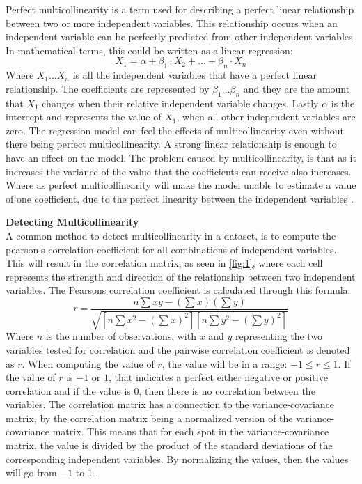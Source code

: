 Perfect multicollinearity is a term used for describing a perfect linear relationship between two or more independent variables. This relationship occurs when an independent variable can be perfectly predicted from other independent variables. In mathematical terms, this could be written as a linear regression:
\begin{equation}
X_1 = \alpha+\beta_1\cdot X_2+...+\beta_n\cdot X_n
\end{equation}
Where $X_1...X_n$ is all the independent variables that have a perfect linear relationship. The coefficients are represented by $\beta_1...\beta_n$ and they are the amount that $X_1$ changes when their relative independent variable changes.
Lastly $\alpha$ is the intercept and represents the value of $X_1$, when all other independent variables are zero.
\newline
The regression model can feel the effects of multicollinearity even without there being perfect multicollinearity. A strong linear relationship is enough to have an effect on the model. The problem caused by multicollinearity, is that as it increases the variance of the value that the coefficients can receive also increases. Where as perfect multicollinearity will make the model unable to estimate a value of one coefficient, due to the perfect linearity between the independent variables \cite{MultAndMis}.
\newline

\noindent \textbf{Detecting Multicollinearity}\\
A common method to detect multicollinearity in a dataset, is to compute the pearson's correlation coefficient for all combinations of independent variables. This will result in the correlation matrix, as seen in \autoref{fig:1}, where each cell represents the strength and direction of the relationship between two independent variables. The Pearsons correlation coefficient is calculated through this formula:
\begin{equation}
r = \frac{n \sum xy - (\sum x)(\sum y)}{\sqrt{[n \sum x^2 - (\sum x)^2][n \sum y^2 - (\sum y)^2]}}
\end{equation}
Where $n$ is the number of observations, with $x$ and $y$ representing the two variables tested for correlation and the pairwise correlation coefficient is denoted as $r$. When computing the value of $r$, the value will be in a range: $-1\leq r \leq 1$. If the value of $r$ is $-1$ or $1$, that indicates a perfect either negative or positive correlation and if the value is $0$, then there is no correlation between the variables. The correlation matrix has a connection to the variance-covariance matrix, by the correlation matrix being a normalized version of the variance-covariance matrix. This means that for each spot in the variance-covariance matrix, the value is divided by the product of the standard deviations of the corresponding independent variables. By normalizing the values, then the values will go from $-1$ to $1$ \cite{DetectMulti}. \newline




